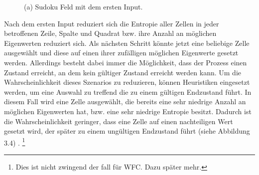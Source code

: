 \documentclass[12pt, a4paper,twoside,openany]{report} %
\begin{document}
\begin{figure}[H]
    \centering
    \caption{(a) Sudoku Feld mit dem ersten Input.}%
\end{figure}

Nach dem ersten Input reduziert sich die Entropie aller Zellen in jeder betroffenen Zeile,
Spalte und Quadrat bzw. ihre Anzahl an möglichen Eigenwerten reduziert sich.
Als nächsten Schritt könnte jetzt eine beliebige Zelle ausgewählt und diese auf einen ihrer zufälligen möglichen Eigenwerte gesetzt werden.
Allerdings besteht dabei immer die Möglichkeit, dass der Prozess einen Zustand erreicht, an dem kein gültiger Zustand erreicht werden kann.
Um die Wahrscheinlichkeit dieses Szenarios zu reduzieren, können Heuristiken eingesetzt werden,
um eine Auswahl zu treffend die zu einem gültigen Endzustand führt.
In diesem Fall wird eine Zelle ausgewählt, die bereits eine sehr niedrige Anzahl an möglichen Eigenwerten hat, bzw. eine sehr niedrige Entropie besitzt.
Dadurch ist die Wahrscheinlichkeit geringer, dass eine Zelle auf einen nachteiligen Wert gesetzt wird,
der später zu einem ungültigen Endzustand führt {(siehe Abbildung 3.4)} \cite{boris}.
\footnote[2]{Dies ist nicht zwingend der fall für WFC. Dazu später mehr.}
\end{document}
